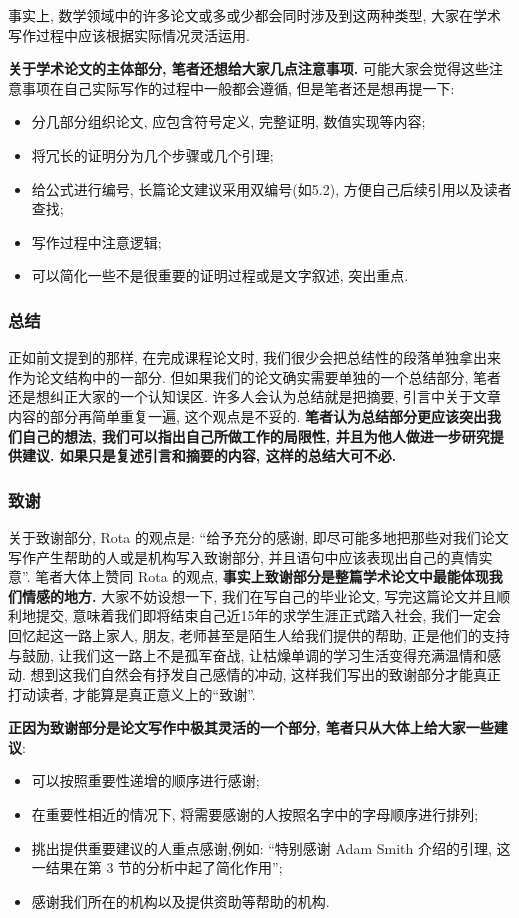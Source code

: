 \documentclass{booki}
\begin{document}
\par 事实上, 数学领域中的许多论文或多或少都会同时涉及到这两种类型, 大家在学术写作过程中应该根据实际情况灵活运用.
\par \textbf{关于学术论文的主体部分, 笔者还想给大家几点注意事项.} 可能大家会觉得这些注意事项在自己实际写作的过程中一般都会遵循, 但是笔者还是想再提一下:
\begin{itemize}
    \item 分几部分组织论文, 应包含符号定义, 完整证明, 数值实现等内容{;}
    \item 将冗长的证明分为几个步骤或几个引理{;}
    \item 给公式进行编号, 长篇论文建议采用双编号(如5.2), 方便自己后续引用以及读者查找{;}
    \item 写作过程中注意逻辑{;}
    \item 可以简化一些不是很重要的证明过程或是文字叙述, 突出重点{.}
\end{itemize}
\subsubsection{总结}
正如前文提到的那样, 在完成课程论文时, 我们很少会把总结性的段落单独拿出来作为论文结构中的一部分. 但如果我们的论文确实需要单独的一个总结部分, 笔者还是想纠正大家的一个认知误区. 许多人会认为总结就是把摘要, 引言中关于文章内容的部分再简单重复一遍, 这个观点是不妥的. \textbf{笔者认为总结部分更应该突出我们自己的想法, 我们可以指出自己所做工作的局限性, 并且为他人做进一步研究提供建议. 如果只是复述引言和摘要的内容, 这样的总结大可不必.}
\subsubsection{致谢}
关于致谢部分, Rota 的观点是: ``给予充分的感谢, 即尽可能多地把那些对我们论文写作产生帮助的人或是机构写入致谢部分, 并且语句中应该表现出自己的真情实意''\cite{RotaTen1997}. 笔者大体上赞同 Rota 的观点, \textbf{事实上致谢部分是整篇学术论文中最能体现我们情感的地方. }大家不妨设想一下, 我们在写自己的毕业论文, 写完这篇论文并且顺利地提交, 意味着我们即将结束自己近15年的求学生涯正式踏入社会, 我们一定会回忆起这一路上家人, 朋友, 老师甚至是陌生人给我们提供的帮助, 正是他们的支持与鼓励, 让我们这一路上不是孤军奋战, 让枯燥单调的学习生活变得充满温情和感动. 想到这我们自然会有抒发自己感情的冲动, 这样我们写出的致谢部分才能真正打动读者, 才能算是真正意义上的``致谢''.
\par \textbf{正因为致谢部分是论文写作中极其灵活的一个部分, 笔者只从大体上给大家一些建议}:
\begin{itemize}
    \item 可以按照重要性递增的顺序进行感谢{;}
    \item 在重要性相近的情况下, 将需要感谢的人按照名字中的字母顺序进行排列{;}
    \item 挑出提供重要建议的人重点感谢,例如: ``特别感谢 Adam Smith 介绍的引理, 这一结果在第 3 节的分析中起了简化作用''{;}
    \item 感谢我们所在的机构以及提供资助等帮助的机构{.}
\end{itemize}
\end{document}
